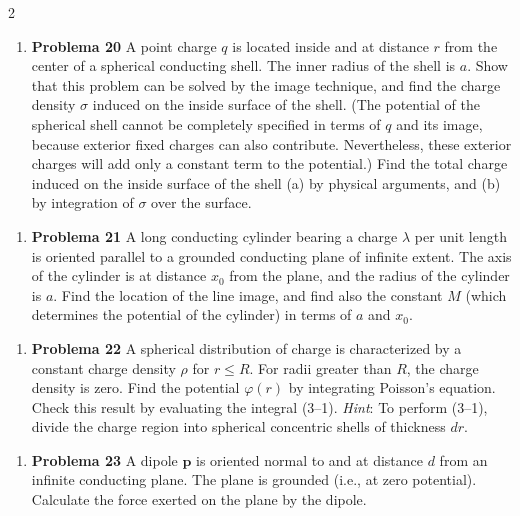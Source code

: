 \documentclass{article}
\begin{document}
\begin{multicols}{2}
\begin{enumerate}[label={{\textcolor{trueblue}{\textbf{Pr.} \arabic*.20}}}, start=3]
\item \textbf{Problema 20} A point charge $q$ is located inside and at distance $r$ from the center of a spherical conducting shell. The inner radius of the shell is $a$. Show that this problem can be solved by the image technique, and find the charge density $\sigma$ induced on the inside surface of the shell. (The potential of the spherical shell cannot be completely specified in terms of $q$ and its image, because exterior fixed charges can also contribute. Nevertheless, these exterior charges will add only a constant term to the potential.) Find the total charge induced on the inside surface of the shell (a) by physical arguments, and (b) by integration of $\sigma$ over the surface.
\end{enumerate}

\begin{enumerate}[label={{\textcolor{trueblue}{\textbf{Pr.} \arabic*.21}}}, start=3]
\item \textbf{Problema 21} A long conducting cylinder bearing a charge $\lambda$ per unit length is oriented parallel to a grounded conducting plane of infinite extent. The axis of the cylinder is at distance $x_{0}$ from the plane, and the radius of the cylinder is $a$. Find the location of the line image, and find also the constant $M$ (which determines the potential of the cylinder) in terms of $a$ and $x_{0}$.
\end{enumerate}

\begin{enumerate}[label={{\textcolor{trueblue}{\textbf{Pr.} \arabic*.22}}}, start=3]
\item \textbf{Problema 22} A spherical distribution of charge is characterized by a constant charge density $\rho$ for $r \le R$. For radii greater than $R$, the charge density is zero. Find the potential $\varphi(r)$ by integrating Poisson’s equation. Check this result by evaluating the integral (3–1). \emph{Hint}: To perform (3–1), divide the charge region into spherical concentric shells of thickness $dr$.
\end{enumerate}

\begin{enumerate}[label={{\textcolor{trueblue}{\textbf{Pr.} \arabic*.23}}}, start=3]
\item \textbf{Problema 23} A dipole $\mathbf{p}$ is oriented normal to and at distance $d$ from an infinite conducting plane. The plane is grounded (i.e., at zero potential). Calculate the force exerted on the plane by the dipole.
\end{enumerate}


\end{multicols}
\end{document}
